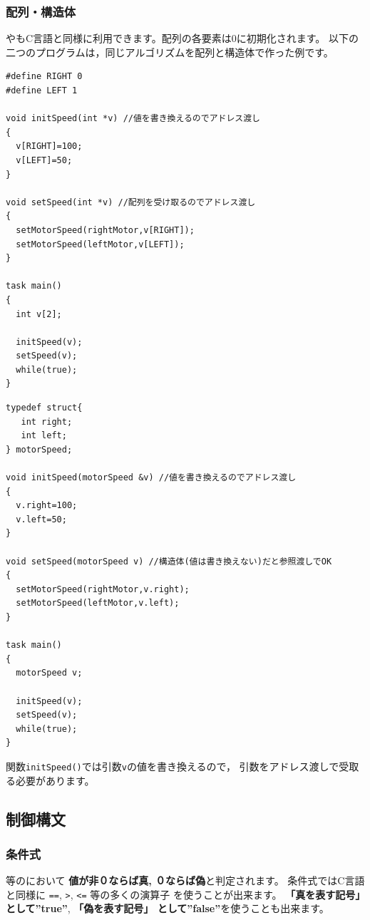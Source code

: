 \documentclass[11pt]{jsarticle}
\makeatletter
\def\nmindex{\@ifnextchar[{\@nmindex}{\@@nmindex}}
\def\@nmindex[#1]#2{#2\index{#1@#2}}
\def\@@nmindex#1{#1\index{#1}}
\makeatother
\begin{document}
\subsubsection{配列・構造体}

\nmindex[はいれつ]{配列}や\nmindex[こうぞうたい]{構造体}もC言語と同様に利用できます。配列の各要素は$0$に初期化されます。
以下の二つのプログラムは，同じアルゴリズムを配列と構造体で作った例です。

\begin{lstlisting}
#define RIGHT 0
#define LEFT 1

void initSpeed(int *v) //値を書き換えるのでアドレス渡し
{
  v[RIGHT]=100;
  v[LEFT]=50;
}

void setSpeed(int *v) //配列を受け取るのでアドレス渡し
{
  setMotorSpeed(rightMotor,v[RIGHT]);
  setMotorSpeed(leftMotor,v[LEFT]);
}

task main() 
{ 
  int v[2];

  initSpeed(v);
  setSpeed(v);
  while(true);
} 
\end{lstlisting}

\begin{lstlisting}
typedef struct{
   int right;
   int left;
} motorSpeed;

void initSpeed(motorSpeed &v) //値を書き換えるのでアドレス渡し
{
  v.right=100;
  v.left=50;
}

void setSpeed(motorSpeed v) //構造体(値は書き換えない)だと参照渡しでOK
{
  setMotorSpeed(rightMotor,v.right);
  setMotorSpeed(leftMotor,v.left);
}

task main() 
{ 
  motorSpeed v;

  initSpeed(v);
  setSpeed(v);
  while(true);
} 
\end{lstlisting}
関数\verb|initSpeed()|では引数\verb|v|の値を書き換えるので，
引数をアドレス渡しで受取る必要があります。

\subsection{制御構文}

\subsubsection{条件式}

\nmindex[ifぶん]{if文}等の\nmindex[じょうけんしき]{条件式}において
\textbf{値が非０ならば真, ０ならば偽}と判定されます。
条件式ではC言語と同様に \verb|==|, \verb|>|, \verb|<=| 等の多くの演算子
を使うことが出来ます。
\textbf{「真を表す記号」として''true''}, \textbf{「偽を表す記号」
  として''false''}を使うことも出来ます。
\end{document}

